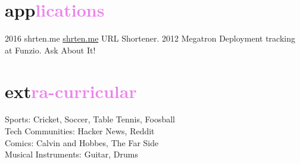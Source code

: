 \documentclass[]{friggeri-cv}
\begin{document}
\section{app\textcolor{violet}{lications}}

\begin{entrylist}
  \entry
    {2016}
    {shrten.me}
    {\href{http://shrten.me}{shrten.me}}
    {URL Shortener.}
  \entry
    {2012}
    {Megatron}
    {}
    {Deployment tracking at Funzio. Ask About It!}
\end{entrylist}

\section{ext\textcolor{violet}{ra-curricular}}
Sports: Cricket, Soccer, Table Tennis, Foosball\\
Tech Communities: Hacker News, Reddit\\
Comics: Calvin and Hobbes, The Far Side\\
Musical Instruments: Guitar, Drums
\end{document}
